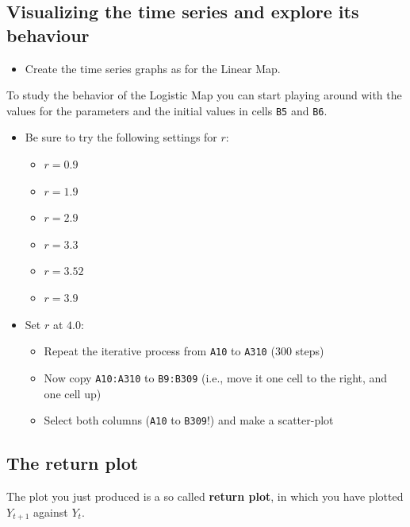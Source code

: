 \documentclass[]{book}
\providecommand{\tightlist}{%
  \setlength{\itemsep}{0pt}\setlength{\parskip}{0pt}}
\begin{document}
\subsection{Visualizing the time series and explore its
behaviour}\label{visualizing-the-time-series-and-explore-its-behaviour}

\begin{itemize}
\tightlist
\item
  Create the time series graphs as for the Linear Map.
\end{itemize}

To study the behavior of the Logistic Map you can start playing around
with the values for the parameters and the initial values in cells
\texttt{B5} and \texttt{B6}.

\begin{itemize}
\tightlist
\item
  Be sure to try the following settings for \(r\):

  \begin{itemize}
  \tightlist
  \item
    \(r = 0.9\)
  \item
    \(r = 1.9\)
  \item
    \(r = 2.9\)
  \item
    \(r = 3.3\)
  \item
    \(r = 3.52\)
  \item
    \(r = 3.9\)
  \end{itemize}
\item
  Set \(r\) at \(4.0\):

  \begin{itemize}
  \tightlist
  \item
    Repeat the iterative process from \texttt{A10} to \texttt{A310} (300
    steps)
  \item
    Now copy \texttt{A10:A310} to \texttt{B9:B309} (i.e., move it one
    cell to the right, and one cell up)
  \item
    Select both columns (\texttt{A10} to \texttt{B309}!) and make a
    scatter-plot
  \end{itemize}
\end{itemize}

\subsection{The return plot}\label{the-return-plot}

The plot you just produced is a so called \textbf{return plot}, in which
you have plotted \(Y_{t+1}\) against \(Y_t\).
\end{document}
